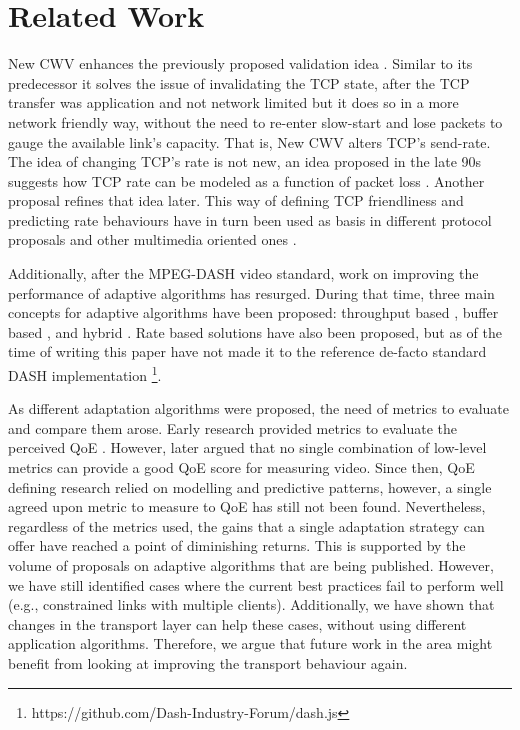 \documentclass[10pt,sigconf]{acmart}
\begin{document}
\section{Related Work}

New CWV enhances the previously proposed validation idea \cite{rfc2861-2000-padhye-congestion-window-validation}. Similar to its predecessor it solves the issue of invalidating the TCP state, after the TCP transfer was application and not network limited but it does so in a more network friendly way, without the need to re-enter slow-start and lose packets to gauge the available link's capacity. That is, New CWV alters TCP's send-rate. The idea of changing TCP's rate is not new, an idea proposed in the late 90s suggests how TCP rate can be modeled as a function of packet loss \cite{Mathis-1997-the-macroscopic-behavior-tcp}. Another proposal \cite{Padhye-1998-modelling-tcp-throughput} refines that idea later. This way of defining TCP friendliness and predicting rate behaviours have in turn been used as basis in different protocol proposals \cite{rfc-5348-tfrc,Rossi-2010-ledbat,Arun-2018-copa} and other multimedia oriented ones \cite{Carlucci-2016-Analysis-WebRTC,Choi-2007-fairer-tfrc}.


Additionally, after the MPEG-DASH video standard, work on improving the performance of adaptive algorithms has resurged. During that time, three main concepts for adaptive algorithms have been proposed: throughput based \cite{Sun-2016-cs2p, Jiang-2012-improving-fairness-http-video-festive}, buffer based \cite{Spiteri-2016-BOLA,Huang-2015-A-buffer-based-approach-to-rate-adaptation-bba}, and hybrid \cite{Spiteri-2019-from-theory-to-practice-sabre,Wang-2016-squad}. Rate based solutions \cite{Li-2014-probe-and-adapt-panda,Liu-2011-rate-adaptation} have also been proposed, but as of the time of writing this paper have not made it to the reference de-facto standard DASH implementation \footnote{https://github.com/Dash-Industry-Forum/dash.js}.


As different adaptation algorithms were proposed, the need of metrics to evaluate and compare them arose. Early research provided metrics to evaluate the perceived QoE \cite{Cranley-2006-user-perception-adapting-video}. However, later \cite{Balachandran-2012-quest-for-internet-video-qoe} argued that no single combination of low-level metrics can provide a good QoE score for measuring video. Since then, QoE defining research relied on modelling and predictive patterns, however, a single agreed upon metric to measure to QoE has still not been found. Nevertheless, regardless of the metrics used, the gains that a single adaptation strategy can offer have reached a point of diminishing returns. This is supported by the volume of proposals on adaptive algorithms that are being published. However, we have still identified cases where the current best practices fail to perform well (e.g., constrained links with multiple clients). Additionally, we have shown that changes in the transport layer can help these cases, without using different application algorithms. Therefore, we argue that future work in the area might benefit from looking at improving the transport behaviour again. 
\end{document}
